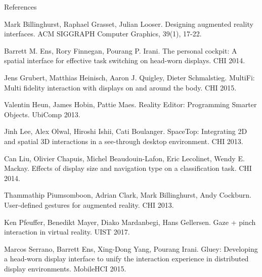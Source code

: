 \begin{frame}[allowframebreaks]{References}
  \begin{thebibliography}{10}
      Mark Billinghurst, Raphael Grasset, Julian Looser.
      \newblock Designing augmented reality interfaces.
      \newblock ACM SIGGRAPH Computer Graphics, 39(1), 17-22.

      Barrett M. Ens, Rory Finnegan, Pourang P. Irani.
      \newblock The personal cockpit: A spatial interface for effective task switching on head-worn displays.
      \newblock CHI 2014.

      Jens Grubert, Matthias Heinisch, Aaron J. Quigley, Dieter Schmalstieg.
      \newblock MultiFi: Multi fidelity interaction with displays on and around the body.
      \newblock CHI 2015.

      Valentin Heun, James Hobin, Pattie Maes.
      \newblock Reality Editor: Programming Smarter Objects.
      \newblock UbiComp 2013.

      Jinh Lee, Alex Olwal, Hiroshi Ishii, Cati Boulanger.
      \newblock SpaceTop: Integrating 2D and spatial 3D interactions in a see-through desktop environment.
      \newblock CHI 2013.

      Can Liu, Olivier Chapuis, Michel Beaudouin-Lafon, Eric Lecolinet, Wendy E. Mackay.
      \newblock Effects of display size and navigation type on a classification task.
      \newblock CHI 2014.

      Thammathip Piumsomboon, Adrian Clark, Mark Billinghurst, Andy Cockburn.
      \newblock User-defined gestures for augmented reality.
      \newblock CHI 2013.

      Ken Pfeuffer, Benedikt Mayer, Diako Mardanbegi, Hans Gellersen.
      \newblock Gaze + pinch interaction in virtual reality.
      \newblock UIST 2017.

      Marcos Serrano, Barrett Ens, Xing-Dong Yang, Pourang Irani.
      \newblock Gluey: Developing a head-worn display interface to unify the interaction experience in distributed display environments.
      \newblock MobileHCI 2015.


\end{thebibliography}
\end{frame}
